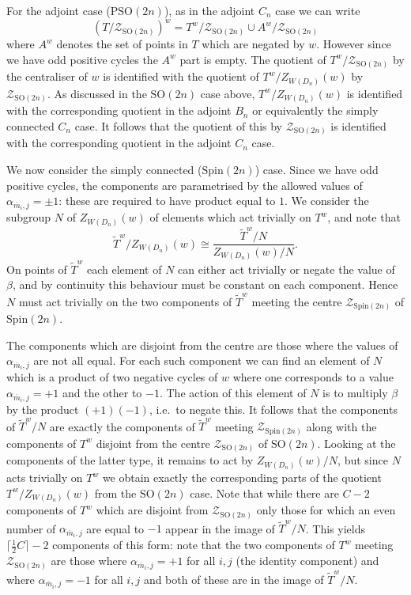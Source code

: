 \documentclass[11pt,a4paper]{article}
\def\Spin{\mathrm{Spin}}
\def\SO{\mathrm{SO}}
\def\PSO{\mathrm{PSO}}
\def\mbar{\overline{m}}
\def\cZ{\mathcal{Z}}
\def\cZ{{\mathcal Z}}
\def\mbar{\overline{m}}
\def\coveringtorus{\tilde{T}}
\def\ZDSpin{\cZ_{\Spin(2n)}}
\def\ZDSO{\cZ_{\SO(2n)}}
\begin{document}
For the adjoint case ($\PSO(2n)$), as in the adjoint $C_n$ case we can write
\[(T/\ZDSO)^w=T^w/\ZDSO \cup A^w/\ZDSO
\]
where $A^w$ denotes the set of points in $T$ which are negated by $w$.  However since we have odd positive cycles the $A^w$ part is empty. The quotient of $T^w/\ZDSO$ by the centraliser of $w$ is identified with the quotient of $T^w/Z_{W(D_n)}(w)$ by $\ZDSO$. As discussed in the $\SO(2n)$ case above, $T^w/Z_{W(D_n)}(w)$ is identified with the corresponding quotient in the adjoint $B_n$ or equivalently the simply connected $C_n$ case. It follows that the quotient of this by $\ZDSO$ is identified with the corresponding quotient in the adjoint $C_n$ case.

We now consider the simply connected ($\Spin(2n)$) case. Since we have odd positive cycles, the components are parametrised by the allowed values of $\alpha_{\mbar_i,j}=\pm 1$: these are required to have product equal to $1$. We consider the subgroup $N$ of $Z_{W(D_n)}(w)$ of elements which act trivially on $T^w$, and note that
\[
{\coveringtorus^w}/{Z_{W(D_n)}(w)} \cong \frac{\coveringtorus^w/N}{Z_{W(D_n)}(w)/N}.
\]
On points of $\coveringtorus^w$ each element of $N$ can either act trivially or negate the value of $\beta$, and by continuity this behaviour must be constant on each component. Hence $N$ must act trivially on the two components of $\coveringtorus^w$ meeting the centre $\ZDSpin$ of $\Spin(2n)$.

The components which are disjoint from the centre are those where the values of $\alpha_{\mbar_i,j}$ are not all equal. For each such component we can find an element of $N$ which is a product of two negative cycles of $w$ where one corresponds to a value $\alpha_{\mbar_i,j}=+1$ and the other to $-1$. The action of this element of $N$ is to multiply $\beta$ by the product $(+1)(-1)$, i.e.\ to negate this. It follows that the components of $\coveringtorus^w/N$ are exactly the components of $\coveringtorus^w$ meeting $\ZDSpin$ along with the components of $T^w$ disjoint from the centre $\ZDSO$ of $\SO(2n)$. Looking at the components of the latter type, it remains to act by $Z_{W(D_n)}(w)/N$, but since $N$ acts trivially on $T^w$ we obtain exactly the corresponding parts of the quotient $T^w/Z_{W(D_n)}(w)$ from the $\SO(2n)$ case. Note that while there are $C-2$ components of $T^w$ which are disjoint from $\ZDSO$ only those for which an even number of $\alpha_{\mbar_i,j}$ are equal to $-1$ appear in the image of $\coveringtorus^w/N$. This yields $\lceil\frac 12 C\rceil-2$ components of this form: note that the two components of $T^w$ meeting $\ZDSO$ are those where $\alpha_{\mbar_i,j}=+1$ for all $i,j$ (the identity component) and where $\alpha_{\mbar_i,j}=-1$ for all $i,j$ and both of these are in the image of $\coveringtorus^w/N$.
\end{document}
